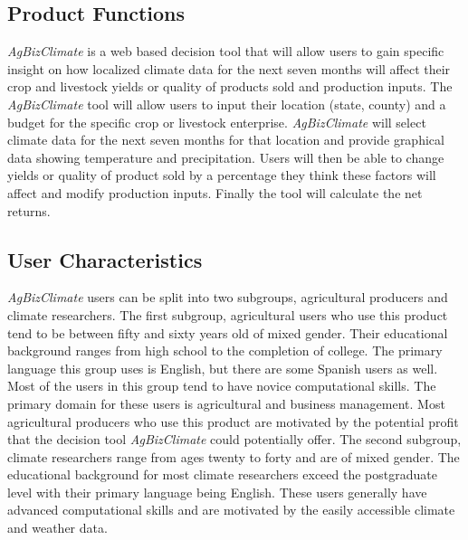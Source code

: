 \documentclass[onecolumn, draftclsnofoot,10pt, compsoc]{article}
\begin{document}
	\subsection {Product Functions}
				\textit{AgBizClimate} is a web based decision tool that will allow users to gain specific insight on how localized climate data for the next seven months will affect their crop and livestock yields or quality of products sold and production inputs. The \textit{AgBizClimate} tool will allow users to input their location (state, county) and a budget for the specific crop or livestock enterprise. \textit{AgBizClimate} will select climate data for the next seven months for that location and provide graphical data showing temperature and precipitation. Users will then be able to change yields or quality of product sold by a percentage they think these factors will affect and modify production inputs. Finally the tool will calculate the net returns.\\

	\subsection{User Characteristics}
		\textit{AgBizClimate} users can be split into two subgroups, agricultural producers and climate researchers. The first subgroup, agricultural users who use this product tend to be between fifty and sixty years old of mixed gender. Their educational background ranges from high school to the completion of college. The primary language this group uses is English, but there are some Spanish users as well. Most of the users in this group tend to have novice computational skills. The primary domain for these users is agricultural and business management. Most agricultural producers who use this product are motivated by the potential profit that the decision tool \textit{AgBizClimate} could potentially offer. The second subgroup, climate researchers range from ages twenty to forty and are of mixed gender. The educational background for most climate researchers  exceed the postgraduate level with their primary language being English. These users generally have advanced computational skills and are motivated by the easily accessible climate and weather data.\\
\end{document}

